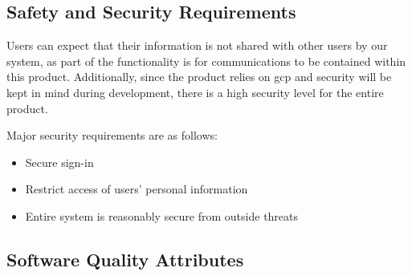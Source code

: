     \subsection{Safety and Security Requirements}\label{sec:safety-security}
        Users can expect that their information is not shared with other users by our system, as part of the functionality is for communications to be contained within this product. Additionally, since the product relies on \gls{gcp} and security will be kept in mind during development, there is a high security level for the entire product.
        \par Major security requirements are as follows:
        \begin{itemize}
            \item Secure sign-in
            \item Restrict access of users' personal information
            \item Entire system is reasonably secure from outside threats
        \end{itemize}
    \subsection{Software Quality Attributes}\label{sec:quality-attributes}
